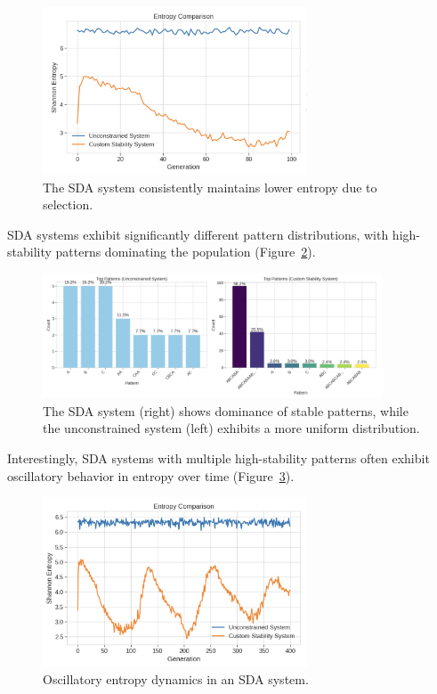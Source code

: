 \documentclass[preprint,12pt]{elsarticle}
\begin{document}
\begin{figure}[h]
    \centering
    \includegraphics[width=0.7\textwidth]{figure_3.png}
    \caption{The SDA system consistently maintains lower entropy due to selection.}
    \label{fig:figure_3}
\end{figure}

SDA systems exhibit significantly different pattern distributions, with high-stability patterns dominating the population (Figure~\ref{fig:figure_4}).

\begin{figure}[h]
    \centering
    \includegraphics[width=0.9\textwidth]{figure_4}
    \caption{The SDA system (right) shows dominance of stable patterns, while the unconstrained system (left) exhibits a more uniform distribution.}
    \label{fig:figure_4}
\end{figure}

Interestingly, SDA systems with multiple high-stability patterns often exhibit oscillatory behavior in entropy over time (Figure~\ref{fig:figure_5}).

\begin{figure}[h]
    \centering
    \includegraphics[width=0.7\textwidth]{figure_5}
    \caption{Oscillatory entropy dynamics in an SDA system.}
    \label{fig:figure_5}
\end{figure}
\end{document}
